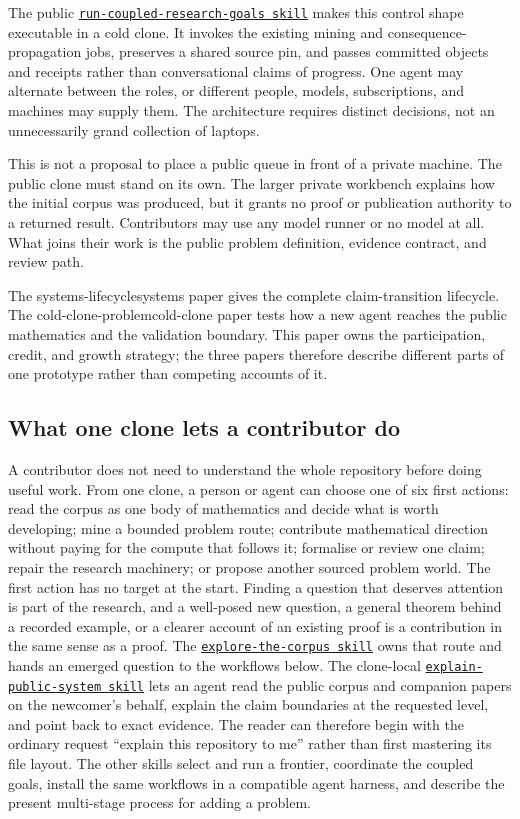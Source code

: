 \documentclass[10pt]{article}
\newcommand{\repobase}{https://github.com/wcook04/plectis-erdos}
\newcommand{\repolink}[2]{\href{\repobase/blob/1d70482583cc9c662cd3b86f66d75c54bb405aa6/#1}{\texttt{#2}}}
\begin{document}
The public \repolink{skills/run-coupled-research-goals/SKILL.md}%
{run-coupled-research-goals skill} makes this control shape executable in a
cold clone.  It invokes the existing mining and consequence-propagation jobs,
preserves a shared source pin, and passes committed objects and receipts rather
than conversational claims of progress.  One agent may alternate between the
roles, or different people, models, subscriptions, and machines may supply
them.  The architecture requires distinct decisions, not an unnecessarily
grand collection of laptops.

This is not a proposal to place a public queue in front of a private machine.
The public clone must stand on its own.  The larger private workbench explains
how the initial corpus was produced, but it grants no proof or publication
authority to a returned result.  Contributors may use any model runner or no
model at all.  What joins their work is the public problem definition,
evidence contract, and review path.

The %
{systems-lifecycle}{systems paper} gives the complete claim-transition
lifecycle. The %
{cold-clone-problem}{cold-clone paper} tests how a new agent reaches the public
mathematics and the validation boundary. This paper owns the participation,
credit, and growth strategy; the three papers therefore describe different
parts of one prototype rather than competing accounts of it.

\subsection*{What one clone lets a contributor do}

A contributor does not need to understand the whole repository before doing
useful work.  From one clone, a person or agent can choose one of six first
actions: read the corpus as one body of mathematics and decide what is worth
developing; mine a bounded problem route; contribute mathematical direction
without paying for the compute that follows it; formalise or review one claim;
repair the research machinery; or propose another sourced problem world.  The
first action has no target at the start.  Finding a question that deserves
attention is part of the research, and a well-posed new question, a general
theorem behind a recorded example, or a clearer account of an existing proof
is a contribution in the same sense as a proof.  The
\repolink{skills/explore-the-corpus/SKILL.md}{explore-the-corpus skill} owns
that route and hands an emerged question to the workflows below.  The
clone-local \repolink{skills/explain-public-system/SKILL.md}%
{explain-public-system skill} lets an agent read the public corpus and companion
papers on the newcomer's behalf, explain the claim boundaries at the requested
level, and point back to exact evidence.  The reader can therefore begin with
the ordinary request ``explain this repository to me'' rather than first
mastering its file layout.  The other skills select and run a frontier,
coordinate the coupled goals, install the same workflows in a compatible agent
harness, and describe the present multi-stage process for adding a problem.
\end{document}
